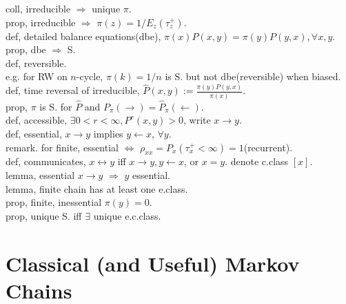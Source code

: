 \documentclass[paper=a4, fontsize=11pt]{scrartcl} %
\numberwithin{equation}{section} %
\numberwithin{figure}{section} %
\numberwithin{table}{section} %
\begin{document}
coll, irreducible $\Rightarrow$ unique $\pi$.\\
prop, irreducible $\Rightarrow$ $\pi(z)=1/E_z(\tau_z^+)$.\\
def, detailed balance equations(dbe), $\pi(x)P(x,y)=\pi(y)P(y,x),\forall x,y$.\\
prop, dbe $\Rightarrow$ S.\\
def, reversible.\\
e.g. for RW on $n$-cycle, $\pi(k)=1/n$ is S. but not dbe(reversible) when biased.\\
def, time reversal of irreducible, $\widehat{P}(x,y):=\frac{\pi(y)P(y,x)}{\pi(x)}$.\\
prop, $\pi$ is S. for $\widehat{P}$ and $P_{\pi}(\rightarrow)=\widehat{P}_\pi(\leftarrow)$.\\
def, accessible, $\exists 0<r<\infty, P^r(x,y)>0$, write $x\rightarrow y$.\\
def, essential, $x\rightarrow y$ implies $y\leftarrow x$, $\forall y$.\\
remark. for finite, essential $\Leftrightarrow$ $\rho_{xx}=P_x(\tau_x^+<\infty)=1$(recurrent).\\
def, communicates, $x \leftrightarrow y$ iff $x\rightarrow y,y\leftarrow x$, or $x=y$. denote c.class $[x]$.\\
lemma, essential $x\rightarrow y$ $\Rightarrow$ $y$ essential.\\
lemma, finite chain has at least one e.class.\\
prop, finite, inessential $\pi(y)=0$.\\
prop, unique S. iff $\exists$ unique e.c.class.\\

\section{Classical (and Useful) Markov Chains}
\end{document}
